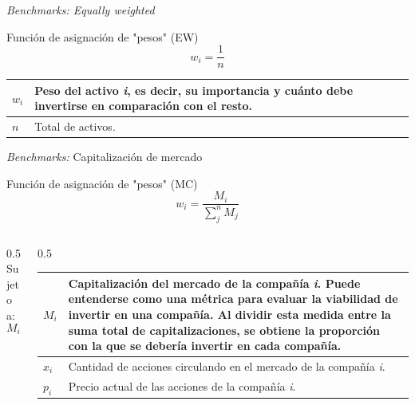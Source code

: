 \documentclass[aspectratio=169,xcolor=dvipsnames]{beamer}
\begin{document}
\begin{frame}{\textit{Benchmarks: Equally weighted}}
    \begin{block}{Función de asignación de "pesos" (EW)}
        \begin{equation}
            w_{i} = \frac{1}{n} \tag{2}   
        \end{equation}
    \end{block}
    \vspace{0.5cm}
    \small %

    \begin{tabularx}{\textwidth}{@{}lX@{}}
        \toprule
        $w_{i}$ & Peso del activo \emph{i}, es decir, su importancia y cuánto debe invertirse en comparación con el resto. \\
        \midrule
        $n$ & Total de activos. \\
        \bottomrule
    \end{tabularx}
\end{frame}

\begin{frame}{\textit{Benchmarks: }Capitalización de mercado}
        \begin{block}{Función de asignación de "pesos" (MC)}
        \begin{equation}
            w_{i} = \frac{M_{i}}{\sum_{j}^{n}M_{j}}   \tag{3}
        \end{equation}
    \end{block}
    \begin{columns}

    \begin{column}{0.5\textwidth}
        \small
        Sujeto a:
        \begin{equation}
        M_{i} = x_{i}p_{i} \tag{4.1}   
        \end{equation}
    \end{column}

    \begin{column}{0.5\textwidth}
        \small
\begin{tabularx}{\textwidth}{@{}lX@{}}
    \toprule
    $M_{i}$ & Capitalización del mercado de la compañía \emph{i}. Puede entenderse como una métrica para evaluar la viabilidad de invertir en una compañía. Al dividir esta medida entre la suma total de capitalizaciones, se obtiene la proporción con la que se debería invertir en cada compañía. \\
    \midrule
    $x_{i}$ & Cantidad de acciones circulando en el mercado de la compañía \emph{i}. \\
    \midrule
    $p_{i}$ & Precio actual de las acciones de la compañía \emph{i}. \\
    \bottomrule
    \end{tabularx}
        \end{column}
    \end{columns}
\end{frame}
\end{document}

